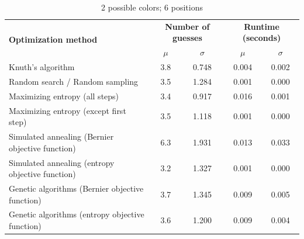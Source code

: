 \documentclass[11pt]{article}
\begin{document}
\begin{table}[h!]
\begin{center}
\begin{tabular}{l c c c c}
\toprule
\multirow{2}{*}{\bfseries Optimization method} 		& \multicolumn{2}{c}{\bfseries Number of guesses} 		& \multicolumn{2}{c}{\bfseries Runtime (seconds)}	\\
\cmidrule(lr){2-3}  \cmidrule(lr){4-5}				& $\mu$ & $\sigma$								& $\mu$ & $\sigma$							\\
\cmidrule(lr){1-5}
Knuth's algorithm							& 3.8 & 0.748									& 0.004 & 0.002							\\
Random search / Random sampling				& 3.5 & 1.284									& 0.001 & 0.000							\\
Maximizing entropy (all steps)					& 3.4 & 0.917									& 0.016 & 0.001							\\
Maximizing entropy (except first step)			& 3.5 & 1.118									& 0.001 & 0.000							\\
Simulated annealing (Bernier objective function)	& 6.3 & 1.931									& 0.013 & 0.033							\\
Simulated annealing (entropy objective function)	& 3.2 & 1.327									& 0.001 & 0.000							\\
Genetic algorithms (Bernier objective function)		& 3.7 & 1.345									& 0.009 & 0.005							\\
Genetic algorithms (entropy objective function)		& 3.6 & 1.200									& 0.009 & 0.004							\\
\bottomrule
\end{tabular}
\end{center}
\caption{2 possible colors; 6 positions}
\label{fig:compare_2_6}
\end{table}
\end{document}
